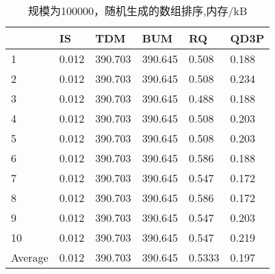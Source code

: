 \documentclass[12pt,a4paper]{ctexart}
\begin{document}
\begin{table}[H]
    \setlength{\abovecaptionskip}{0cm}
    \setlength{\belowcaptionskip}{0.5cm}
    \small
    \centering
    \caption[short]{规模为100000，随机生成的数组排序,内存/kB}
    \begin{tabular}{|l|l|l|l|l|l|}
        \hline
                & IS    & TDM     & BUM     & RQ     & QD3P  \\ \hline
        1       & 0.012 & 390.703 & 390.645 & 0.508  & 0.188 \\ \hline
        2       & 0.012 & 390.703 & 390.645 & 0.508  & 0.234 \\ \hline
        3       & 0.012 & 390.703 & 390.645 & 0.488  & 0.188 \\ \hline
        4       & 0.012 & 390.703 & 390.645 & 0.508  & 0.203 \\ \hline
        5       & 0.012 & 390.703 & 390.645 & 0.508  & 0.203 \\ \hline
        6       & 0.012 & 390.703 & 390.645 & 0.586  & 0.188 \\ \hline
        7       & 0.012 & 390.703 & 390.645 & 0.547  & 0.172 \\ \hline
        8       & 0.012 & 390.703 & 390.645 & 0.586  & 0.172 \\ \hline
        9       & 0.012 & 390.703 & 390.645 & 0.547  & 0.203 \\ \hline
        10      & 0.012 & 390.703 & 390.645 & 0.547  & 0.219 \\ \hline
        Average & 0.012 & 390.703 & 390.645 & 0.5333 & 0.197 \\ \hline
    \end{tabular}
\end{table}
\end{document}
